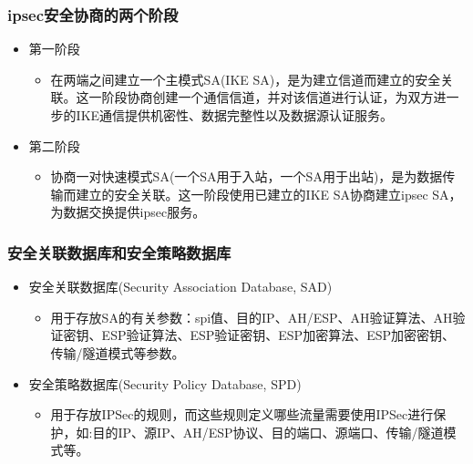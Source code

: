 \documentclass[xcolor=svgnames,presentation]{beamer}
\begin{document}
\begin{frame}
\frametitle{ipsec安全协商的两个阶段}
\label{sec-4-6}
\begin{itemize}

\item 第一阶段
\label{sec-4-6-1}%
\begin{itemize}

\item 在两端之间建立一个主模式SA(IKE SA)，是为建立信道而建立的安全关联。这一阶段协商创建一个通信信道，并对该信道进行认证，为双方进一步的IKE通信提供机密性、数据完整性以及数据源认证服务。
\label{sec-4-6-1-1}%
\end{itemize} %

\item 第二阶段
\label{sec-4-6-2}%
\begin{itemize}

\item 协商一对快速模式SA(一个SA用于入站，一个SA用于出站)，是为数据传输而建立的安全关联。这一阶段使用已建立的IKE SA协商建立ipsec SA，为数据交换提供ipsec服务。
\label{sec-4-6-2-1}%
\end{itemize} %
\end{itemize} %
\end{frame}
\begin{frame}
\frametitle{安全关联数据库和安全策略数据库}
\label{sec-4-7}
\begin{itemize}

\item 安全关联数据库(Security Association Database, SAD)
\label{sec-4-7-1}%
\begin{itemize}

\item 用于存放SA的有关参数：spi值、目的IP、AH/ESP、AH验证算法、AH验证密钥、ESP验证算法、ESP验证密钥、ESP加密算法、ESP加密密钥、传输/隧道模式等参数。
\label{sec-4-7-1-1}%
\end{itemize} %

\item 安全策略数据库(Security Policy Database, SPD)
\label{sec-4-7-2}%
\begin{itemize}

\item 用于存放IPSec的规则，而这些规则定义哪些流量需要使用IPSec进行保护，如:目的IP、源IP、AH/ESP协议、目的端口、源端口、传输/隧道模式等。
\label{sec-4-7-2-1}%
\end{itemize} %
\end{itemize} %
\end{frame}
\end{document}
